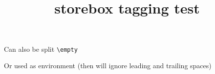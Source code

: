 \documentclass{article}
\title{storebox tagging test}
\begin{document}

\usestorebox{\mybox}
\usestorebox{\mybox}

\storebox\mybox\bgroup
Can also be split
\verb+\empty+
\egroup

\usestorebox{\mybox}
\usestorebox{\mybox}

\begin{storebox}{\mybox}
 Or used as environment
 (then will ignore leading and trailing spaces)
\end{storebox}

\usestorebox{\mybox}
\usestorebox{\mybox}
\end{document}
